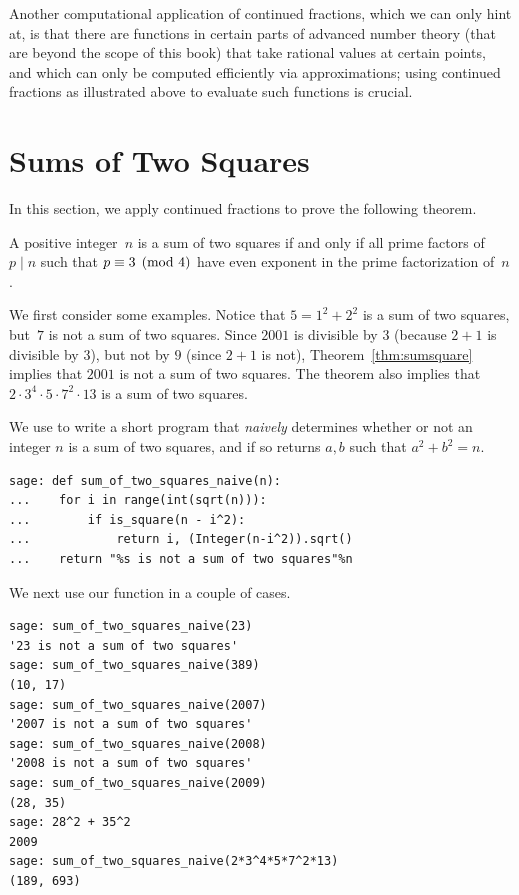 Another computational application of continued fractions, which we can
only hint at, is that there are functions in certain parts of advanced
number theory (that are beyond the scope of this book) that take
rational values at certain points, and which can only be computed
efficiently via approximations; using continued fractions as
illustrated above to evaluate such functions is crucial.



\section{Sums of Two Squares}\label{sec:sumsqr}
In this section, we apply continued fractions to prove
the following theorem.
\begin{theorem}\label{thm:sumsquare}
  A positive integer~$n$ is a sum of two squares if and only if all
  prime factors of~$p\mid n$ such that $p\equiv 3\pmod{4}$ have even
  exponent in the prime factorization of~$n$.
\end{theorem}
We first consider some examples.  Notice that $5 = 1^2 + 2^2$ is a sum
of two squares, but~$7$ is not a sum of two squares.  Since $2001$ is
divisible by $3$ (because $2+1$ is divisible by $3$),
but not by $9$ (since $2+1$ is not),
Theorem~\ref{thm:sumsquare} implies that $2001$ is not a sum of two
squares.  The theorem also implies that $2\cdot 3^4\cdot 5\cdot 7^2\cdot
13$ is a sum of two squares.

\begin{sg}
We use \sage to write a short program that {\em naively} determines
whether or not an integer $n$ is a sum of two squares, and if
so returns $a,b$ such that $a^2 + b^2 = n$.
\begin{verbatim}
sage: def sum_of_two_squares_naive(n):
...    for i in range(int(sqrt(n))):
...        if is_square(n - i^2):
...            return i, (Integer(n-i^2)).sqrt()
...    return "%s is not a sum of two squares"%n
\end{verbatim}%
We next use our function in a couple of cases.
\begin{verbatim}
sage: sum_of_two_squares_naive(23)
'23 is not a sum of two squares'
sage: sum_of_two_squares_naive(389)
(10, 17)
sage: sum_of_two_squares_naive(2007)
'2007 is not a sum of two squares'
sage: sum_of_two_squares_naive(2008)
'2008 is not a sum of two squares'
sage: sum_of_two_squares_naive(2009)
(28, 35)
sage: 28^2 + 35^2
2009
sage: sum_of_two_squares_naive(2*3^4*5*7^2*13)
(189, 693)
\end{verbatim}%
\end{sg}

